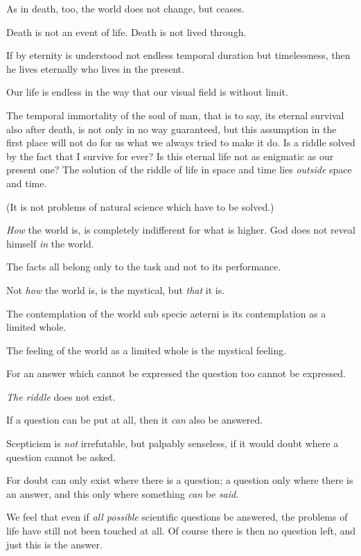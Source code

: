 {As in death, too, the world does not change,
but ceases.}


{Death is not an event of life. Death is not lived
through.

If by eternity is understood not endless temporal
duration but timelessness, then he lives eternally
who lives in the present.

Our life is endless in the way that our visual
field is without limit.}


{The temporal immortality of the soul of man,
that is to say, its eternal survival also after
death, is not only in no way guaranteed, but
this assumption in the first place will not do
for us what we always tried to make it do.
Is a riddle solved by the fact that I survive for
ever? Is this eternal life not as enigmatic as
our present one? The solution of the riddle of
life in space and time lies \emph{outside} space and
time.

{\stretchyspace
(It is not problems of natural science which have
to be solved.)}}


{\emph{How} the world is, is completely indifferent for
what is higher. God does not reveal himself \emph{in} the
world.}


{The facts all belong only to the task and not to
its performance.}


{Not \emph{how} the world is, is the mystical, but \emph{that}
it is.}


{The contemplation of the world sub specie aeterni
is its contemplation as a limited whole.

The feeling of the world as a limited whole is
the mystical feeling.}


{For an answer which cannot be expressed the
question too cannot be expressed.

\emph{The riddle} does not exist.

If a question can be put at all, then it \emph{can} also
be answered.}


{Scepticism is \emph{not} irrefutable, but palpably senseless,
if it would doubt where a question cannot be
asked.

For doubt can only exist where there is a
question; a question only where there is an answer,
and this only where something \emph{can} be \emph{said}.}


{We feel that even if \emph{all possible} scientific
questions be answered, the problems of life have
still not been touched at all. Of course there is
then no question left, and just this is the
answer.}


